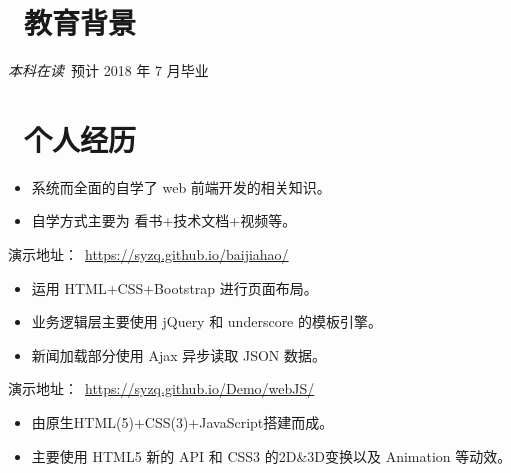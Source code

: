 \documentclass{resume}
\begin{document}


  

 
\section{\faGraduationCap\  教育背景}
\textit{本科在读}\ 预计 2018 年 7 月毕业


\section{\faUser\ 个人经历}
\begin{itemize}
  \item 系统而全面的自学了 web 前端开发的相关知识。
  \item 自学方式主要为 看书+技术文档+视频等。
  
\end{itemize}

\begin{onehalfspacing}
演示地址：\faLink \ \href{https://syzq.github.io/baijiahao/}{https://syzq.github.io/baijiahao/}
\begin{itemize}
  \item 运用 HTML+CSS+Bootstrap 进行页面布局。
  \item 业务逻辑层主要使用 jQuery 和 underscore 的模板引擎。
  \item 新闻加载部分使用 Ajax 异步读取 JSON 数据。
\end{itemize}
\end{onehalfspacing}

\begin{onehalfspacing}
演示地址：\faLink \ \href{https://syzq.github.io/Demo/webJS/}{https://syzq.github.io/Demo/webJS/}
\begin{itemize}
  \item 由原生HTML(5)+CSS(3)+JavaScript搭建而成。
  \item 主要使用 HTML5 新的 API 和 CSS3 的2D\&3D变换以及 Animation 等动效。
\end{itemize}
\end{onehalfspacing}
\end{document}
